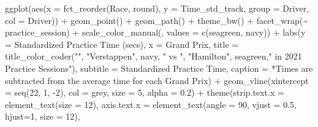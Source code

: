 \documentclass[
]{book}
\newenvironment{Shaded}{\begin{snugshade}}{\end{snugshade}}
\newcommand{\AttributeTok}[1]{\textcolor[rgb]{0.77,0.63,0.00}{#1}}
\newcommand{\DecValTok}[1]{\textcolor[rgb]{0.00,0.00,0.81}{#1}}
\newcommand{\FloatTok}[1]{\textcolor[rgb]{0.00,0.00,0.81}{#1}}
\newcommand{\FunctionTok}[1]{\textcolor[rgb]{0.00,0.00,0.00}{#1}}
\newcommand{\NormalTok}[1]{#1}
\newcommand{\SpecialCharTok}[1]{\textcolor[rgb]{0.00,0.00,0.00}{#1}}
\newcommand{\StringTok}[1]{\textcolor[rgb]{0.31,0.60,0.02}{#1}}
\begin{document}
\begin{Shaded}
\begin{Highlighting}[]
  \FunctionTok{ggplot}\NormalTok{(}\FunctionTok{aes}\NormalTok{(}\AttributeTok{x =} \FunctionTok{fct\_reorder}\NormalTok{(Race, round), }\AttributeTok{y =}\NormalTok{ Time\_std\_track,}
                \AttributeTok{group =}\NormalTok{ Driver, }\AttributeTok{col =}\NormalTok{ Driver)) }\SpecialCharTok{+}
  \FunctionTok{geom\_point}\NormalTok{() }\SpecialCharTok{+}
  \FunctionTok{geom\_path}\NormalTok{() }\SpecialCharTok{+} 
  \FunctionTok{theme\_bw}\NormalTok{() }\SpecialCharTok{+}
  \FunctionTok{facet\_wrap}\NormalTok{(}\SpecialCharTok{\textasciitilde{}}\NormalTok{ practice\_session) }\SpecialCharTok{+} 
  \FunctionTok{scale\_color\_manual}\NormalTok{(}\StringTok{\textquotesingle{}\textquotesingle{}}\NormalTok{, }\AttributeTok{values =} \FunctionTok{c}\NormalTok{(}\StringTok{\textquotesingle{}seagreen\textquotesingle{}}\NormalTok{, }\StringTok{\textquotesingle{}navy\textquotesingle{}}\NormalTok{)) }\SpecialCharTok{+}
   \FunctionTok{labs}\NormalTok{(}\AttributeTok{y =} \StringTok{\textquotesingle{}Standardized Practice Time (secs)\textquotesingle{}}\NormalTok{,}
        \AttributeTok{x =} \StringTok{\textquotesingle{}Grand Prix\textquotesingle{}}\NormalTok{,}
        \AttributeTok{title =} \FunctionTok{title\_color\_coder}\NormalTok{(}\StringTok{""}\NormalTok{, }\StringTok{"Verstappen"}\NormalTok{, }\StringTok{\textquotesingle{}navy\textquotesingle{}}\NormalTok{, }\StringTok{" vs "}\NormalTok{, }\StringTok{"Hamilton"}\NormalTok{, }\StringTok{\textquotesingle{}seagreen\textquotesingle{}}\NormalTok{,}\StringTok{"  in 2021 Practice Sessions"}\NormalTok{),}
        \AttributeTok{subtitle =} \StringTok{\textquotesingle{}Standardized Practice Time\textquotesingle{}}\NormalTok{,}
        \AttributeTok{caption =} \StringTok{\textquotesingle{}*Times are subtracted from the average time for each Grand Prix\textquotesingle{}}\NormalTok{) }\SpecialCharTok{+}
  \FunctionTok{geom\_vline}\NormalTok{(}\AttributeTok{xintercept =} \FunctionTok{seq}\NormalTok{(}\DecValTok{22}\NormalTok{, }\DecValTok{1}\NormalTok{, }\SpecialCharTok{{-}}\DecValTok{2}\NormalTok{), }\AttributeTok{col =} \StringTok{\textquotesingle{}grey\textquotesingle{}}\NormalTok{, }\AttributeTok{size =} \DecValTok{5}\NormalTok{, }\AttributeTok{alpha =}  \FloatTok{0.2}\NormalTok{) }\SpecialCharTok{+}
  \FunctionTok{theme}\NormalTok{(}\AttributeTok{strip.text.x =} \FunctionTok{element\_text}\NormalTok{(}\AttributeTok{size =} \DecValTok{12}\NormalTok{),}
        \AttributeTok{axis.text.x =} \FunctionTok{element\_text}\NormalTok{(}\AttributeTok{angle =} \DecValTok{90}\NormalTok{, }\AttributeTok{vjust =} \FloatTok{0.5}\NormalTok{, }\AttributeTok{hjust=}\DecValTok{1}\NormalTok{, }\AttributeTok{size =} \DecValTok{12}\NormalTok{),}

\end{Highlighting}
\end{Shaded}
\end{document}
